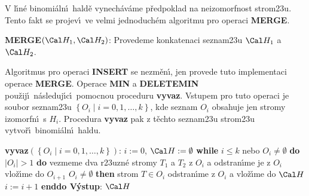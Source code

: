 \flushpar V l\'\i n\'e binomi\'aln\'\i\ hald\v e vynech\'av\'ame p\v redpoklad 
na neizo\-morf\-nost strom\accent23u. Tento fakt se 
projev\'\i\ ve velmi jednoduch\'em algoritmu pro operaci 
{\bf MERGE}.
\medskip

{\bf MERGE$\left(\Cal H_1,\Cal H_2\right)$}:\newline 
Provedeme konkatenaci seznam\accent23u $\Cal H_1$ a $\Cal H_2$.
\bigskip

\flushpar Algoritmus pro operaci {\bf INSERT} se nezm\v en\'\i , jen 
provede tuto implementaci operace {\bf MERGE}.  Operace 
{\bf MIN} a {\bf DELETE\-MIN} pou\v zij\'\i\ n\'asleduj\'\i c\'\i\ pomocnou 
proceduru {\bf vyvaz}.  Vstupem pro tuto operaci je soubor 
seznam\accent23u $\left\{O_i\mid i=0,1,\dots,k\right\}$, kde seznam $O_i$ 
obsahuje jen stromy izomorfn\'\i\ s $H_i$.  
Procedura {\bf vyvaz} pak z t\v echto seznam\accent23u strom\accent23u 
vytvo\v r\'\i\ binomi\'aln\'\i\ hal\-du.  
\bigskip

{\bf vyvaz$\left(\left\{O_i\mid i=0,1,\dots,k\right\}\right)$}:\newline 
$i:=0$, $\Cal H:=\emptyset$\newline 
{\bf while} $i\le k$ nebo $O_i\ne\emptyset$ {\bf do}\newline 
\phantom{---}{\bf while} $|O_i|>1$ {\bf do\newline}
\phantom{------}vezmeme dva r\accent23uzn\'e stromy $T_1$ a $T_2$ z $O_i$ a 
odstran\'\i me je z $O_i$\newline 
\phantom{------}{\bf spoj$\left(T_1,T_2\right)$} vlo\v z\'\i me do $O_{i+1}$\newline 
\phantom{---}{\bf enddo}\newline 
\phantom{---}{\bf if} $O_i\ne\emptyset$ {\bf then}\newline 
\phantom{------}strom $T\in O_i$ odstran\'\i me z $O_i$ a vlo\v z\'\i me do $\Cal H$\newline 
\phantom{---}{\bf endif}\newline 
\phantom{---}$i:=i+1$\newline 
{\bf enddo\newline 
V\'ystup}: $\Cal H$
\bigskip

